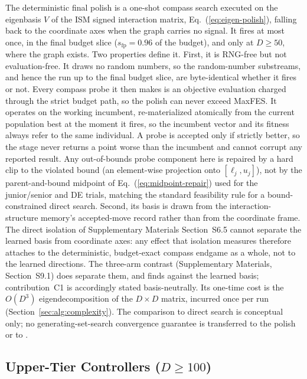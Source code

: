 The deterministic final polish is a one-shot compass search
executed on the eigenbasis $V$ of the ISM signed interaction matrix,
Eq.~(\ref{eq:eigen-polish}), falling back to the coordinate axes when
the graph carries no signal.
It fires at most once, in the final budget slice
($s_{\text{fp}}=0.96$ of the budget), and only at $D\ge50$,
where the graph exists. %
Two properties define it.
First, it is RNG-free but not evaluation-free. It draws no random
numbers, so the random-number substreams, and hence the run up to
the final budget slice, are byte-identical whether it fires or not.
Every compass probe it then makes is an objective evaluation charged
through the strict budget path, so the polish can never exceed
MaxFES. %
It operates on the working incumbent, re-materialized atomically from the current
population best at the moment it fires, so the incumbent vector and its fitness
always refer to the same individual. A probe is accepted only if strictly
better, so the stage never returns a
point worse than the incumbent and cannot corrupt any reported result. Any out-of-bounds probe component here is repaired by a hard clip to the violated bound (an element-wise projection onto $[\ell_j,u_j]$), not by the parent-and-bound midpoint of Eq.~(\ref{eq:midpoint-repair}) used for the junior/senior and DE trials, matching the standard feasibility rule for a bound-constrained direct search.
Second, its basis is drawn from the interaction-structure memory's accepted-move
record rather than from the coordinate frame. The direct isolation of
Supplementary Materials Section~S6.5 cannot separate the learned basis from
coordinate axes: any effect that isolation measures therefore attaches to the
deterministic, budget-exact compass endgame as a whole, not to the learned
directions. The three-arm contrast (Supplementary
Materials, Section~S9.1) does separate them, and finds against the learned
basis; contribution~C1 is accordingly stated basis-neutrally.
Its one-time cost is the $O(D^{3})$ eigendecomposition of the
$D\times D$ matrix, incurred once per run
(Section~\ref{sec:alg:complexity}). %
The comparison to direct search is conceptual only; no
generating-set-search convergence guarantee is transferred to the
polish or to \dtgsk{}.

\subsection{Upper-Tier Controllers ($D\ge100$)}\label{sec:alg:highd}

